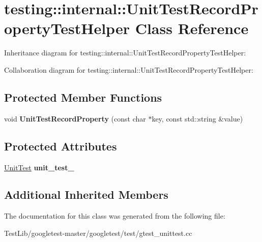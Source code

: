 \hypertarget{classtesting_1_1internal_1_1UnitTestRecordPropertyTestHelper}{}\section{testing\+:\+:internal\+:\+:Unit\+Test\+Record\+Property\+Test\+Helper Class Reference}
\label{classtesting_1_1internal_1_1UnitTestRecordPropertyTestHelper}


Inheritance diagram for testing\+:\+:internal\+:\+:Unit\+Test\+Record\+Property\+Test\+Helper\+:


Collaboration diagram for testing\+:\+:internal\+:\+:Unit\+Test\+Record\+Property\+Test\+Helper\+:
\subsection*{Protected Member Functions}
\begin{DoxyCompactItemize}
\item 
\mbox{\label{classtesting_1_1internal_1_1UnitTestRecordPropertyTestHelper_a9c5432d080faf13a1db6baff0a2944f4}} 
void {\bfseries Unit\+Test\+Record\+Property} (const char $\ast$key, const std\+::string \&value)
\end{DoxyCompactItemize}
\subsection*{Protected Attributes}
\begin{DoxyCompactItemize}
\item 
\mbox{\label{classtesting_1_1internal_1_1UnitTestRecordPropertyTestHelper_a415e13a354d3b8bd97db96aae5ef5df1}} 
\hyperlink{classtesting_1_1UnitTest}{Unit\+Test} {\bfseries unit\+\_\+test\+\_\+}
\end{DoxyCompactItemize}
\subsection*{Additional Inherited Members}


The documentation for this class was generated from the following file\+:\begin{DoxyCompactItemize}
\item 
Test\+Lib/googletest-\/master/googletest/test/gtest\+\_\+unittest.\+cc\end{DoxyCompactItemize}
